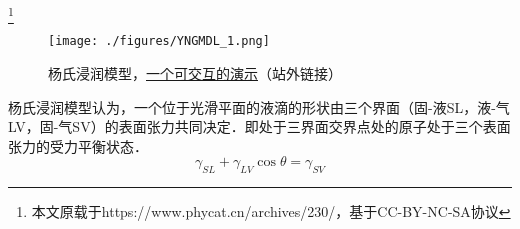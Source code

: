 \footnote{本文原载于https://www.phycat.cn/archives/230/，基于CC-BY-NC-SA协议}

\begin{figure}[ht]
\centering
\texttt{[image: ./figures/YNGMDL\_1.png]}
\caption{杨氏浸润模型，\href{https://www.phycat.cn/archives/230/}{一个可交互的演示}（站外链接）} \label{YNGMDL_fig1}
\end{figure}
杨氏浸润模型认为，一个位于光滑平面的液滴的形状由三个界面（固-液SL，液-气LV，固-气SV）的表面张力共同决定．即处于三界面交界点处的原子处于三个表面张力的受力平衡状态．
\begin{equation}
\gamma_{SL}+\gamma_{LV}\cos\theta=\gamma_{SV}
\end{equation}
